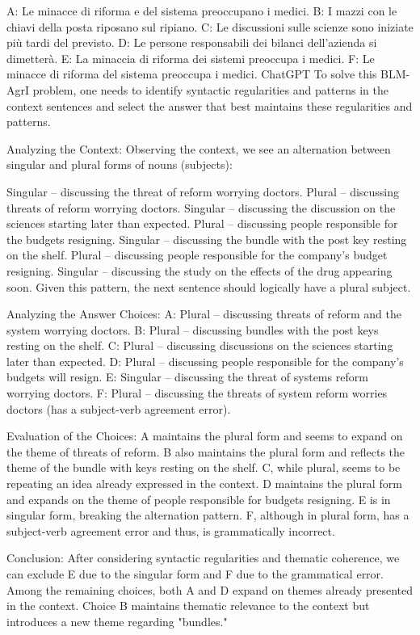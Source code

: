 A: Le minacce di riforma e del sistema preoccupano i medici.
B: I mazzi con le chiavi della posta riposano sul ripiano.
C: Le discussioni sulle scienze sono iniziate più tardi del previsto.
D: Le persone responsabili dei bilanci dell'azienda si dimetterà.
E: La minaccia di riforma dei sistemi preoccupa i medici.
F: Le minacce di riforma del sistema preoccupa i medici.
ChatGPT
To solve this BLM-AgrI problem, one needs to identify syntactic regularities and patterns in the context sentences and select the answer that best maintains these regularities and patterns.

Analyzing the Context:
Observing the context, we see an alternation between singular and plural forms of nouns (subjects):

Singular – discussing the threat of reform worrying doctors.
Plural – discussing threats of reform worrying doctors.
Singular – discussing the discussion on the sciences starting later than expected.
Plural – discussing people responsible for the budgets resigning.
Singular – discussing the bundle with the post key resting on the shelf.
Plural – discussing people responsible for the company’s budget resigning.
Singular – discussing the study on the effects of the drug appearing soon.
Given this pattern, the next sentence should logically have a plural subject.

Analyzing the Answer Choices:
A: Plural – discussing threats of reform and the system worrying doctors.
B: Plural – discussing bundles with the post keys resting on the shelf.
C: Plural – discussing discussions on the sciences starting later than expected.
D: Plural – discussing people responsible for the company’s budgets will resign.
E: Singular – discussing the threat of systems reform worrying doctors.
F: Plural – discussing the threats of system reform worries doctors (has a subject-verb agreement error).

Evaluation of the Choices:
A maintains the plural form and seems to expand on the theme of threats of reform.
B also maintains the plural form and reflects the theme of the bundle with keys resting on the shelf.
C, while plural, seems to be repeating an idea already expressed in the context.
D maintains the plural form and expands on the theme of people responsible for budgets resigning.
E is in singular form, breaking the alternation pattern.
F, although in plural form, has a subject-verb agreement error and thus, is grammatically incorrect.

Conclusion:
After considering syntactic regularities and thematic coherence, we can exclude E due to the singular form and F due to the grammatical error. Among the remaining choices, both A and D expand on themes already presented in the context. Choice B maintains thematic relevance to the context but introduces a new theme regarding "bundles."

